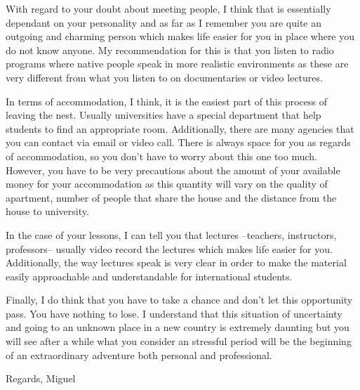 \documentclass[10pt]{article}
\begin{document}
With regard to your doubt about meeting people, I think that is essentially 
dependant on your personality and as far as I remember you are quite an outgoing and 
charming person which makes life easier for you in place where you do not know anyone. 
My recommendation for this is that you listen to radio programs  
where native people speak in more realistic environments
as these are very different from 
what you listen to on documentaries or video lectures.

In terms of accommodation, I think, it is the easiest part of this process
of leaving the nest. Usually universities have a special department that help 
students to find an appropriate room. Additionally, there are many agencies 
that you can contact via email or video call. 
There is always space for you as regards of accommodation, 
so you don't have to worry about this one too much.
However, you have to be very precautious about the amount of your available money
for your accommodation as this quantity will vary on the quality of apartment, 
number of people that share the house and the distance from the house to 
university.

In the case of your lessons, I can tell you that lectures --teachers, instructors, professors-- 
usually video record the lectures which makes life easier for you. Additionally, 
the way lectures speak is very clear in order to make the material easily approachable 
and understandable for international students.

Finally, I do think that you have to take a chance and don't let this opportunity pass.
You have nothing to lose. I understand that this situation of uncertainty and going to 
an unknown place in a new country is extremely daunting but you will see after a while
what you consider an stressful period will be the beginning of an
extraordinary adventure both personal and professional.

Regards,
Miguel
\end{document}
